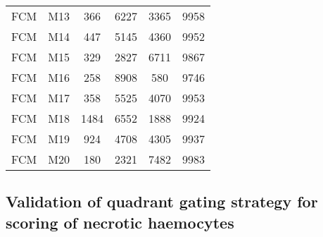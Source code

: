 \begin{center}
\begin{longtable}{cccccc}
FCM	&	M13	&	366	&	6227	&	3365	&	9958	\\
FCM	&	M14	&	447	&	5145	&	4360	&	9952	\\
FCM	&	M15	&	329	&	2827	&	6711	&	9867	\\
FCM	&	M16	&	258	&	8908	&	580	&	9746	\\
FCM	&	M17	&	358	&	5525	&	4070	&	9953	\\
FCM	&	M18	&	1484	&	6552	&	1888	&	9924	\\
FCM	&	M19	&	924	&	4708	&	4305	&	9937	\\
FCM	&	M20	&	180	&	2321	&	7482	&	9983	\\



\end{longtable}    
\end{center}




\subsection{Validation of quadrant gating strategy for scoring of necrotic haemocytes}

